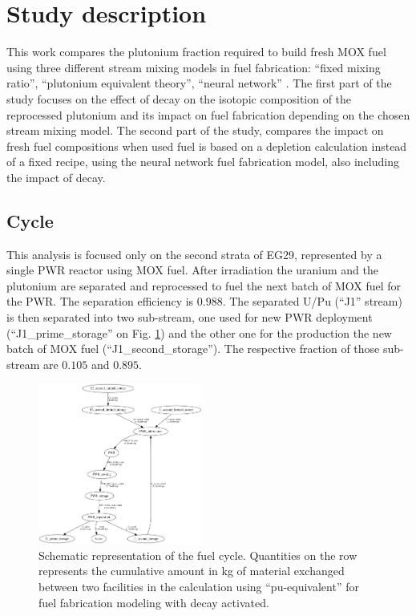 \documentclass{anstrans}
\begin{document}
\section{Study description}

This work compares the plutonium fraction required to build fresh MOX fuel
using three different stream mixing models in fuel fabrication: ``fixed mixing
ratio'', ``plutonium equivalent theory'', ``neural network'' \cite{Leniau2015125}.
The first part of the study focuses on the effect of decay on the isotopic
composition of the reprocessed plutonium and its impact on fuel fabrication
depending on the chosen stream mixing model.  The second part of the study,
compares the impact on fresh fuel compositions when used fuel is based on a
depletion calculation instead of a fixed recipe, using the neural network fuel
fabrication model, also including the impact of decay.


\subsection{Cycle}

This analysis is focused only on the second strata of EG29, represented by a
single PWR reactor using MOX fuel. After irradiation the uranium and the
plutonium are separated and reprocessed to fuel the next batch of MOX fuel for
the PWR. The separation efficiency is $0.988$. The separated U/Pu (``J1''
stream) is then separated into two sub-stream, one used for new PWR deployment
(``J1\_prime\_storage'' on Fig. \ref{fig:flow}) and the other one for the
production the new batch of MOX fuel (``J1\_second\_storage''). The respective
fraction of those sub-stream are $0.105$ and $0.895$.

\begin{figure}[ht] %
  \centering
  \includegraphics[width=0.48\textwidth]{flow}
  \caption{Schematic representation of the fuel cycle. Quantities on the row
  represents the cumulative amount in kg of material exchanged between two
  facilities in the calculation using ``pu-equivalent'' for fuel fabrication
  modeling with decay activated.}
  \label{fig:flow}
\end{figure}
\end{document}
